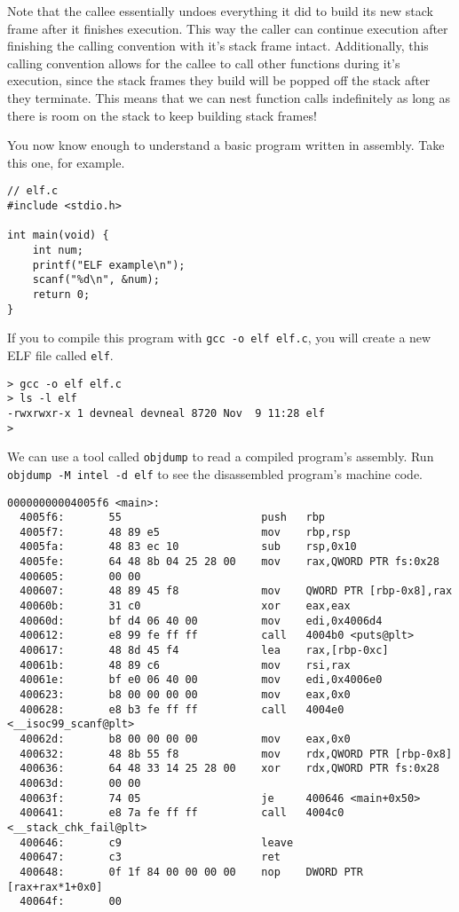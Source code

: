 Note that the callee essentially undoes everything it did to build its new stack
frame after it finishes execution. This way the caller can continue execution
after finishing the calling convention with it's stack frame intact.
Additionally, this calling convention allows for the callee to call other
functions during it's execution, since the stack frames they build will be
popped off the stack after they terminate. This means that we can nest function
calls indefinitely as long as there is room on the stack to keep building stack
frames!

You now know enough to understand a basic program written in assembly. Take this
one, for example.

\begin{lstlisting}
// elf.c 
#include <stdio.h>

int main(void) {
    int num;
    printf("ELF example\n");
    scanf("%d\n", &num);
    return 0;
}
\end{lstlisting}

If you to compile this program with \texttt{gcc -o elf elf.c}, you will create
a new ELF file called \texttt{elf}.

\begin{lstlisting}
> gcc -o elf elf.c 
> ls -l elf
-rwxrwxr-x 1 devneal devneal 8720 Nov  9 11:28 elf
> 
\end{lstlisting}

We can use a tool called \texttt{objdump} to read a compiled program's assembly.
Run \texttt{objdump -M intel -d elf} to see the disassembled program's machine
code.

\begin{lstlisting}
00000000004005f6 <main>:
  4005f6:       55                      push   rbp
  4005f7:       48 89 e5                mov    rbp,rsp
  4005fa:       48 83 ec 10             sub    rsp,0x10
  4005fe:       64 48 8b 04 25 28 00    mov    rax,QWORD PTR fs:0x28
  400605:       00 00 
  400607:       48 89 45 f8             mov    QWORD PTR [rbp-0x8],rax
  40060b:       31 c0                   xor    eax,eax
  40060d:       bf d4 06 40 00          mov    edi,0x4006d4
  400612:       e8 99 fe ff ff          call   4004b0 <puts@plt>
  400617:       48 8d 45 f4             lea    rax,[rbp-0xc]
  40061b:       48 89 c6                mov    rsi,rax
  40061e:       bf e0 06 40 00          mov    edi,0x4006e0
  400623:       b8 00 00 00 00          mov    eax,0x0
  400628:       e8 b3 fe ff ff          call   4004e0 <__isoc99_scanf@plt>
  40062d:       b8 00 00 00 00          mov    eax,0x0
  400632:       48 8b 55 f8             mov    rdx,QWORD PTR [rbp-0x8]
  400636:       64 48 33 14 25 28 00    xor    rdx,QWORD PTR fs:0x28
  40063d:       00 00 
  40063f:       74 05                   je     400646 <main+0x50>
  400641:       e8 7a fe ff ff          call   4004c0 <__stack_chk_fail@plt>
  400646:       c9                      leave  
  400647:       c3                      ret    
  400648:       0f 1f 84 00 00 00 00    nop    DWORD PTR [rax+rax*1+0x0]
  40064f:       00
\end{lstlisting}

